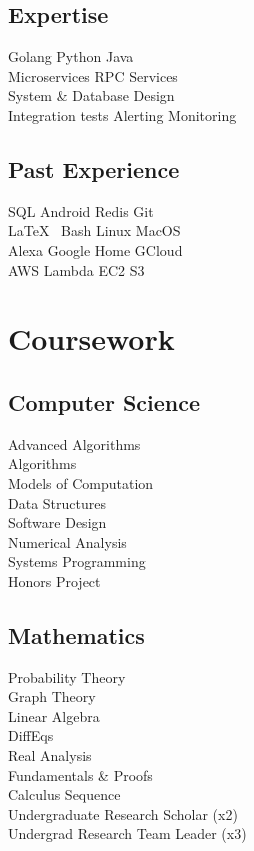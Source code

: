 \documentclass[]{deedy-resume-openfont}
\begin{document}
\begin{minipage}[t]{0.33\textwidth}
\subsection{Expertise}
Golang \textbullet{} Python \textbullet{} Java \\
Microservices \textbullet{} RPC Services \\ System \& Database Design \\
Integration tests \textbullet{} Alerting \textbullet{} Monitoring \\
\vspace{2pt}

\subsection{Past Experience}
SQL \textbullet{} Android  \textbullet{} Redis \textbullet{} Git \\
\LaTeX\ \textbullet{} Bash \textbullet{} Linux \textbullet{} MacOS \\
Alexa \textbullet{} Google Home \textbullet{} GCloud \\
AWS \textbullet{} Lambda \textbullet{} EC2 \textbullet{} S3 \\
\sectionsep



\vspace{8pt}

\section{Coursework}
\subsection{Computer Science}
Advanced Algorithms \\
Algorithms \\
Models of Computation \\
Data Structures \\
Software Design \\
Numerical Analysis \\
Systems Programming\\
Honors Project \\
\sectionsep

\subsection{Mathematics}
Probability Theory \\
Graph Theory \\
Linear Algebra \\
DiffEqs \\
Real Analysis \\
Fundamentals \& Proofs \\
Calculus Sequence \\
Undergraduate Research Scholar (x2) \\
Undergrad Research Team Leader (x3) \\
\sectionsep



\end{minipage}
\end{document}
